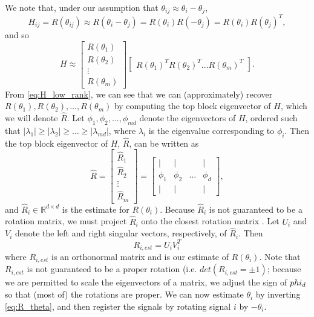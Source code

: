 \documentclass[11pt]{article}
\begin{document}
We note that, under our assumption that $\theta_{ij} \approx \theta_i - \theta_j$, 
\begin{equation} 
H_{ij} = R(\theta_{ij}) \approx R(\theta_i - \theta_j) = R(\theta_i) R(-\theta_j) = R(\theta_i) R(\theta_j)^T,
\end{equation}
 and so
\begin{equation} \label{eq:H_low_rank}
	H \approx 
	\begin{bmatrix}
	R(\theta_1) \\
	R(\theta_2) \\
	\vdots \\
	R(\theta_m)
	\end{bmatrix}
	\begin{bmatrix}
	R(\theta_1)^T R(\theta_2)^T \dots R(\theta_m)^T
	\end{bmatrix}.
\end{equation}
%
From \eqref{eq:H_low_rank}, we can see that we can (approximately) recover $R(\theta_1), R(\theta_2), \dots, R(\theta_m)$ by computing the top block eigenvector of $H$, which we will denote $\hat{R}$.
%
Let $\phi_1, \phi_2, \dots, \phi_{md}$ denote the eigenvectors of $H$, ordered such that $|\lambda_1| \ge |\lambda_2| \ge \dots \ge |\lambda_{md}|$, where $\lambda_i$ is the eigenvalue corresponding to $\phi_i$. 
%
Then the top block eigenvector of $H$, $\hat{R}$, can be written as
\begin{equation}
\hat{R} = 
\begin{bmatrix}
\hat{R}_1 \\
\hat{R}_2 \\
\vdots \\
\hat{R}_m
\end{bmatrix} =
\begin{bmatrix}
| & | & & | \\
\phi_1 & \phi_2 & \dots & \phi_d \\
| & | & & | 
\end{bmatrix},
\end{equation}
and $\hat{R}_i \in \mathbb{R}^{d \times d}$ is the estimate for $R(\theta_i)$. 
%
Because $\hat{R}_i$ is not guaranteed to be a rotation matrix, we must project $\hat{R}_i$ onto the closest rotation matrix \cite{...}. 
%
Let $U_i$ and $V_i$ denote the left and right singular vectors, respectively, of $\hat{R}_i$.
%
Then
\begin{equation}
R_{i, est} = U_i V_i^T
\end{equation} 
where $R_{i, est}$ is an orthonormal matrix and is our estimate of $R(\theta_i)$. 
%
Note that $R_{i, est}$ is not guaranteed to be a proper rotation (i.e. $det(R_{i, est} = \pm 1)$; because we are permitted to scale the eigenvectors of a matrix, we adjust the sign of $\\phi_d$ so that (most of) the rotations are proper. 
%
We can now estimate $\theta_{i}$ by inverting \eqref{eq:R_theta}, and then register the signals by rotating signal $i$ by $-\theta_i$. 
\end{document}
